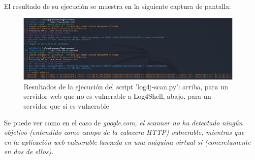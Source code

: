 \documentclass[../main.tex]{subfiles}
\begin{document}
El resultado de su ejecución se muestra en la siguiente captura de pantalla:
\begin{figure}[!h]
\centering
\includegraphics[width=15.0cm]{imagenes/2-Log4Shell/scanner_no-vulnerable-vs-vulnerable.png}
\caption{Resultados de la ejecución del script 'log4j-scan.py': arriba, para un servidor web que no es vulnerable a Log4Shell, abajo, para un servidor que sí es vulnerable}
\end{figure}

Se puede ver como en el caso de \it{google.com}, el scanner no ha detectado ningún objetivo (entendido como campo de la cabecera HTTP) vulnerable, mientras que en la aplicación web vulnerable \cite{vulnerable-app} lanzada en una máquina virtual sí (concretamente en dos de ellos).
\end{document}
